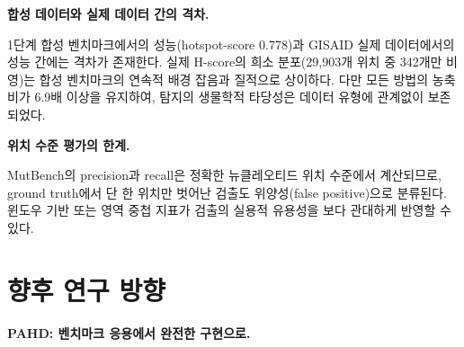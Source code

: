 \textbf{합성 데이터와 실제 데이터 간의 격차.}

1단계 합성 벤치마크에서의 성능(hotspot-score 0.778)과 GISAID 실제 데이터에서의 성능 간에는 격차가 존재한다.
실제 H-score의 희소 분포(29,903개 위치 중 342개만 비영)는 합성 벤치마크의 연속적 배경 잡음과 질적으로 상이하다.
다만 모든 방법의 농축비가 6.9배 이상을 유지하여, 탐지의 생물학적 타당성은 데이터 유형에 관계없이 보존되었다.

\textbf{위치 수준 평가의 한계.}

MutBench의 precision과 recall은 정확한 뉴클레오티드 위치 수준에서 계산되므로, ground truth에서 단 한 위치만 벗어난 검출도 위양성(false positive)으로 분류된다.
윈도우 기반 또는 영역 중첩 지표가 검출의 실용적 유용성을 보다 관대하게 반영할 수 있다.

\section{향후 연구 방향}
\label{sec:future_work}

\begin{table}[htbp]
\centering
\caption{우선순위별 향후 연구 로드맵}
\label{tab:future_roadmap}
\small
{}
\end{table}

\textbf{PAHD: 벤치마크 응용에서 완전한 구현으로.}

